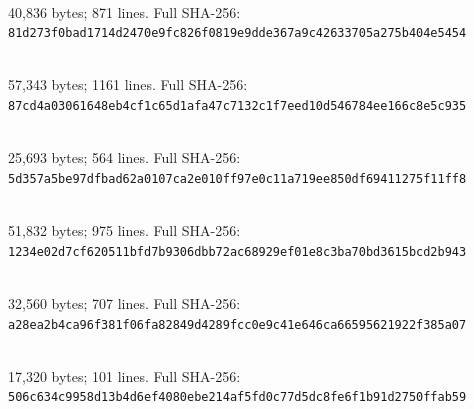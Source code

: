 \documentclass[11pt]{article}
\begin{document}
\par\noindent{}\\
40,836 bytes; 871 lines. Full SHA-256:\\
\nolinkurl{81d273f0bad1714d2470e9fc826f0819e9dde367a9c42633705a275b404e5454}\par\smallskip
\par\noindent{}\\
57,343 bytes; 1161 lines. Full SHA-256:\\
\nolinkurl{87cd4a03061648eb4cf1c65d1afa47c7132c1f7eed10d546784ee166c8e5c935}\par\smallskip
\par\noindent{}\\
25,693 bytes; 564 lines. Full SHA-256:\\
\nolinkurl{5d357a5be97dfbad62a0107ca2e010ff97e0c11a719ee850df69411275f11ff8}\par\smallskip
\par\noindent{}\\
51,832 bytes; 975 lines. Full SHA-256:\\
\nolinkurl{1234e02d7cf620511bfd7b9306dbb72ac68929ef01e8c3ba70bd3615bcd2b943}\par\smallskip
\par\noindent{}\\
32,560 bytes; 707 lines. Full SHA-256:\\
\nolinkurl{a28ea2b4ca96f381f06fa82849d4289fcc0e9c41e646ca66595621922f385a07}\par\smallskip
\par\noindent{}\\
17,320 bytes; 101 lines. Full SHA-256:\\
\nolinkurl{506c634c9958d13b4d6ef4080ebe214af5fd0c77d5dc8fe6f1b91d2750ffab59}\par\smallskip
\endgroup

\clearpage
\end{document}
